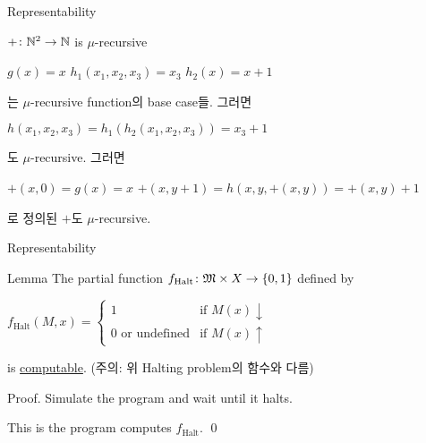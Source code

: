 \documentclass[../231120_msquare_computational-logic.tex]{subfiles}
\begin{document}
\begin{frame}{Representability}
    \begin{exampleblock}{\(+ \colon \mathbb{N}^2 \to \mathbb{N}\) is \(\mu\)-recursive}
        \begin{itemize}
            \ii \(g(x) = x\)
            \ii \(h_1(x_1, x_2, x_3) = x_3\)
            \ii \(h_2(x) = x + 1\)
        \end{itemize}
        는 \(\mu\)-recursive function의 base case들.
        그러면
        \begin{itemize}
            \ii \(h(x_1, x_2, x_3) = h_1(h_2(x_1, x_2, x_3)) = x_3 + 1\)
        \end{itemize}
        도 \(\mu\)-recursive. 그러면
        \begin{itemize}
            \ii \(+(x, 0) = g(x) = x\)
            \ii \(+(x, y + 1) = h(x, y, +(x, y)) = +(x, y) + 1\)
        \end{itemize}
        로 정의된 \(+\)도 \(\mu\)-recursive.
    \end{exampleblock}
\end{frame}

\begin{frame}{Representability}
    \begin{block}{Lemma}
        The partial function \(f_\text{Halt} \colon \mathfrak{M} \times X \to \{0, 1\}\) defined by
        \centerline{\(f_\text{Halt}(M, x) = \begin{cases}
            1 & \text{if } M(x) \downarrow \\
            0 \text{ or undefined} & \text{if } M(x) \uparrow
        \end{cases}\)}
        is \ul{computable}. (주의: 위 Halting problem의 함수와 다름)
    \end{block}
    \pause
    \begin{block}{Proof.}
        Simulate the  program and wait until it halts.
        \begin{center}
        \end{center}
        This is the  program computes \(f_\text{Halt}\).
        \qed
    \end{block}
\end{frame}
\end{document}

